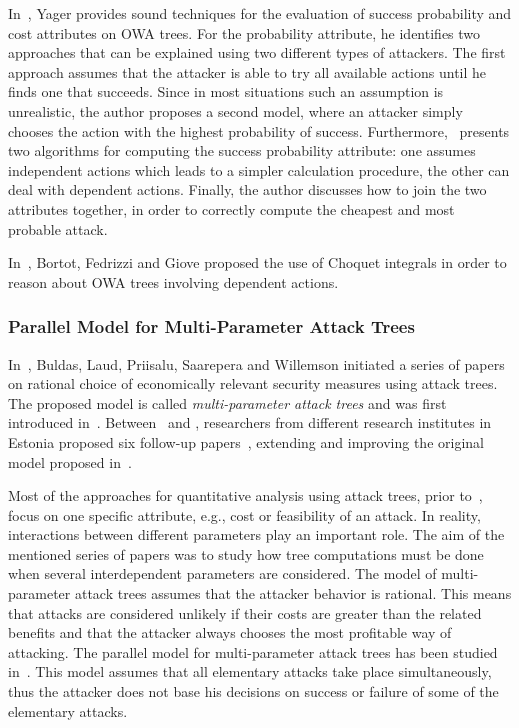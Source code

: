 \documentclass[a4paper]{article}
\begin{document}
In~\cite{Yage}, Yager provides sound techniques for the evaluation of success
probability and cost attributes on OWA trees. For the probability attribute, he
identifies two approaches that can be explained using two different types of
attackers. The first approach assumes that the attacker is able to try all
available actions until he finds one that succeeds. Since in most situations
such an assumption is unrealistic, the author proposes a second model, where an
attacker simply chooses the action with the highest probability of success.
Furthermore,~\cite{Yage} presents two algorithms for computing the success
probability attribute: one assumes independent actions which leads to a simpler
calculation procedure, the other can deal with dependent actions. Finally, the
author discusses how to join the two attributes together, in order to correctly
compute the cheapest and most probable attack.

In~\cite{BoFeGi}, Bortot, Fedrizzi and Giove proposed the use of Choquet
integrals in order to reason about OWA trees involving dependent actions.

\subsubsection{Parallel Model for Multi-Parameter Attack Trees} 
\label{sec:multi-parameter_attack_trees}

In~, Buldas, Laud, Priisalu, Saarepera and Willemson initiated a series of
papers on rational choice of economically relevant security measures using
attack trees. The proposed model is called \emph{multi-parameter attack trees}
and was first introduced in~\cite{BuLaPrSaWi}. Between~ and ,
researchers from different research institutes in Estonia proposed six follow-up
papers~\cite{BuTr,JuWi,JuWi3,WiJu,JuWi2,Niit}, extending and improving the
original model proposed in~\cite{BuLaPrSaWi}.

Most of the approaches for quantitative analysis using attack trees, prior
to~\cite{BuLaPrSaWi}, focus on one specific attribute, e.g., cost or feasibility
of an attack. In reality, interactions between different parameters play an
important role. The aim of the mentioned series of papers was to study how tree
computations must be done when several interdependent parameters are considered.
The model of multi-parameter attack trees assumes that the attacker behavior is
rational. This means that attacks are considered unlikely if their costs are
greater than the related benefits and that the attacker always chooses the most
profitable way of attacking. The parallel model for multi-parameter attack trees
has been studied in~\cite{BuLaPrSaWi,BuTr,JuWi,JuWi3,JuWi2,Jurg}. This model
assumes that all elementary attacks take place simultaneously, thus the attacker
does not base his decisions on success or failure of some of the elementary
attacks.
\end{document}
